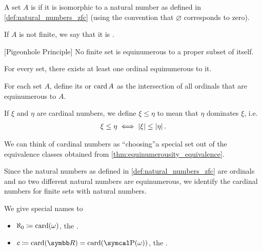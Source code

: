 \begin{definition}\label{def:finite_set}\cite[133]{Enderton1977}
  A set $A$ is  if it is isomorphic to a natural number as defined in \cref{def:natural_numbers_zfc} (using the convention that $\varnothing$ corresponds to zero).

  If $A$ is not finite, we say that it is .
\end{definition}

\begin{theorem}\label{def:pigeonhole_principle}[Pigeonhole Principle]\cite[Corollary 6C]{Enderton1977}
  No finite set is equinumerous to a proper subset of itself.
\end{theorem}

\begin{theorem}\label{thm:equinumerous_ordinal_existence}\cite[197]{Enderton1977}
  For every set, there exists at least one ordinal equinumerous to it.
\end{theorem}

\begin{definition}\label{def:cardinal}\cite[197]{Enderton1977}
  For each set $A$, define its  or  $\operatorname{card} A$ as the intersection of all ordinals that are equinumerous to $A$.

  If $\xi$ and $\eta$ are cardinal numbers, we define $\xi \leq \eta$ to mean that $\eta$ dominates $\xi$, i.e.
  \begin{align*}
    \xi \leq \eta \iff \left\vert \xi \right\vert \leq \left\vert \eta \right\vert.
  \end{align*}
\end{definition}

\begin{note}\label{note:cardinals}
  We can think of cardinal numbers as \enquote{choosing}\AOC a special set out of the equivalence classes obtained from \cref{thm:equinumerousity_equivalence}.

  Since the natural numbers as defined in \cref{def:natural_numbers_zfc} are ordinals and no two different natural numbers are equinumerous, we identify the cardinal numbers for finite sets with natural numbers.

  We give special names to
  \begin{itemize}
    \item $\aleph_0 \coloneqq \operatorname{card}(\omega)$, the .
    \item $c \coloneqq \Card(\BB{R}) = \Card(\Power(\omega))$, the .
  \end{itemize}
\end{note}


